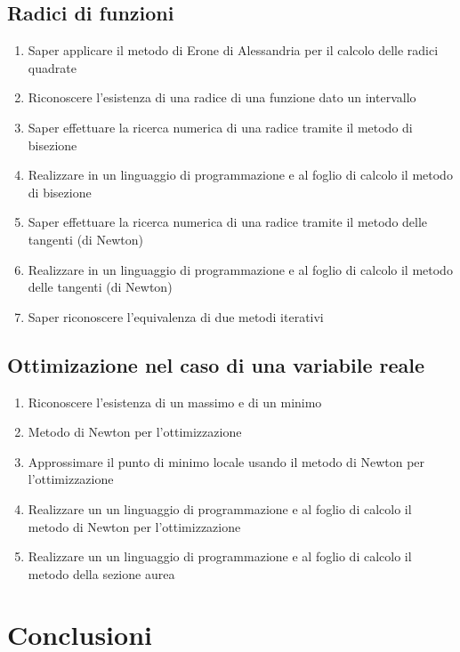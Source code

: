 \documentclass{easychair}
\begin{document}
\subsection[Radici]{Radici di funzioni}

\begin{enumerate}
  \item Saper applicare il metodo di Erone di Alessandria per il calcolo delle radici quadrate
  \item
    Riconoscere l'esistenza di una radice di una funzione dato un intervallo
  \item
    Saper effettuare la ricerca numerica di una radice tramite il metodo
    di bisezione
  \item
    Realizzare in un linguaggio di programmazione e al foglio di calcolo
    il metodo di bisezione
    \item
    Saper effettuare la ricerca numerica di una radice tramite il metodo
    delle tangenti (di Newton)
  \item
    Realizzare in un linguaggio di programmazione e al foglio di calcolo
    il metodo delle tangenti (di Newton)
  \item
    Saper riconoscere l'equivalenza di due metodi iterativi
\end{enumerate}

\subsection[Ottimizzazione]{Ottimizazione nel caso di una variabile reale}

\begin{enumerate}
  \item
  Riconoscere l'esistenza di un massimo e di un minimo
  \item
    Metodo di Newton per l'ottimizzazione
  \item
    Approssimare il punto di minimo locale usando il metodo di Newton
  per l'ottimizzazione
  \item
    Realizzare un un linguaggio di programmazione e al foglio di calcolo
  il metodo di Newton per l'ottimizzazione
  \item
    Realizzare un un linguaggio di programmazione e al foglio di calcolo
  il metodo della sezione aurea
\end{enumerate}
  
\section{Conclusioni}
\end{document}
